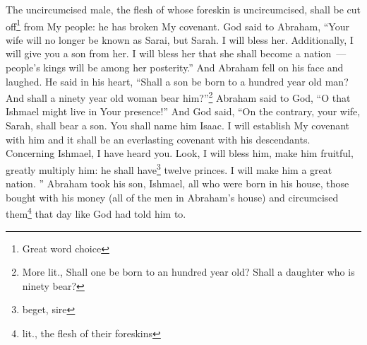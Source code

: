 \begin{enumerate}[align=center]
     The uncircumcised male, the flesh of whose foreskin is uncircumcised, shall be cut off\footnote{Great word choice} from My people: he has broken My covenant.%
     God said to Abraham, ``Your wife will no longer be known as Sarai, but Sarah.%
     I will bless her. Additionally, I will give you a son from her. I will bless her that she shall become a nation~--- people's kings will be among her posterity.''%
     And Abraham fell on his face and laughed. He said in his heart, ``Shall a son be born to a hundred year old man? And shall a ninety year old woman bear him?''\footnote{More lit., Shall one be born to an hundred year old? Shall a daughter who is ninety bear?}%
     Abraham said to God, ``O that Ishmael might live in Your presence!''%
     And God said, ``On the contrary, your wife, Sarah, shall bear a son. You shall name him Isaac. I will establish My covenant with him and it shall be an everlasting covenant with his descendants.%
     Concerning Ishmael, I have heard you. Look, I will bless him, make him fruitful, greatly multiply him: he shall have\footnote{beget, sire} twelve princes. I will make him a great nation.%
     ''%
     Abraham took his son, Ishmael, all who were born in his house, those bought with his money (all of the men in Abraham's house) and circumcised them\footnote{lit., the flesh of their foreskins} that day like God had told him to.%
\end{enumerate}
